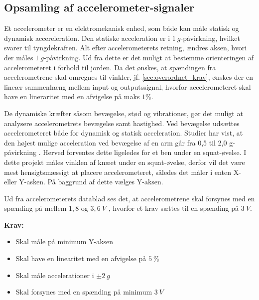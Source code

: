 \subsection{Opsamling af accelerometer-signaler} \label{sec:acc_teori}
Et accelerometer er en elektromekanisk enhed, som både kan måle statisk og dynamisk accereleration. Den statiske acceleration er i $1~g$-påvirkning, hvilket svarer til tyngdekraften. Alt efter accelerometerets retning, ændres aksen, hvori der måles $1~g$-påvirkning. Ud fra dette er det muligt at bestemme orienteringen af accelerometeret i forhold til jorden. Da det ønskes, at spændingen fra accelerometrene skal omregnes til vinkler, jf. \autoref{sec:overordnet_krav}, ønskes der en lineær sammenhæng mellem input og outputssignal, hvorfor accelerometeret skal have en lineraritet med en afvigelse på maks $1\%$. 

De dynamiske kræfter såsom bevægelse, stød og vibrationer, gør det muligt at analysere accelerometrets bevægelse samt hastighed. Ved bevægelse udsættes accelerometeret både for dynamisk og statisk acceleration. Studier har vist, at den højest mulige acceleration ved bevægelse af en arm går fra 0,5 til 2,0 g-påvirkning \citep{bernmarka2002}. Herved forventes dette ligeledes for et ben under en squat-øvelse. I dette projekt måles vinklen af knæet under en squat-øvelse, derfor vil det være mest hensigtsmæssigt at placere accelerometeret, således det måler i enten X- eller Y-asken. På baggrund af dette vælges Y-aksen.

Ud fra accelerometerets datablad ses det, at accelerometrene skal forsynes med en spænding på mellem $1,8$ og $3,6~V$ \citep{analogdevices2009}, hvorfor et krav sættes til en spænding på $3~V$.

\vspace{3mm}
\textbf{Krav:}
\begin{itemize}
\item Skal måle på minimum Y-aksen
\item Skal have en linearitet med en afvigelse på $5~\%$
\item Skal måle accelerationer i $\pm 2~g$
\item Skal forsynes med en spænding på minimum $3~V$
\end{itemize}